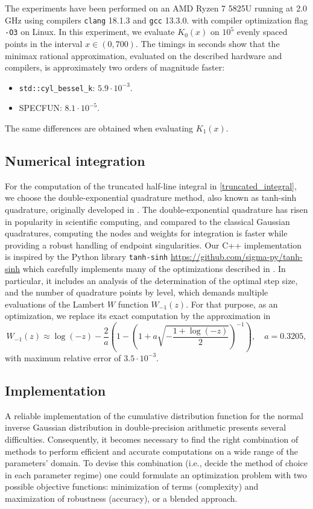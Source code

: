 \documentclass[10pt,a4paper,oneside]{article}
\numberwithin{equation}{section}
\begin{document}
The experiments have been performed on an AMD Ryzen 7 5825U running at 2.0 GHz using compilers \texttt{clang} 18.1.3 and \texttt{gcc} 13.3.0. with compiler optimization flag \texttt{-O3} on Linux. In this experiment, we evaluate $K_0(x)$ on $10^5$ evenly spaced points in the interval $x \in (0, 700)$. The timings in seconds show that the minimax rational approximation, evaluated on the described hardware and compilers, is approximately two orders of magnitude faster:
\begin{itemize}
\item \texttt{std::cyl\_bessel\_k}: $5.9 \cdot 10^{-3}$.
\item SPECFUN: $8.1 \cdot 10^{-5}$.
\end{itemize}
The same differences are obtained when evaluating $K_1(x)$.

\subsection{Numerical integration}\label{algorithmic_numerical_integration}
For the computation of the truncated half-line integral in \eqref{truncated_integral}, we choose the double-exponential quadrature method, also known as tanh-sinh quadrature, originally developed in \cite{Takahasi1973}. The double-exponential quadrature has risen in popularity in scientific computing, and compared to the classical Gaussian quadratures, computing the nodes and weights for integration is faster while providing a robust handling of endpoint singularities. Our C++ implementation is inspired by the Python library \texttt{tanh-sinh} \url{https://github.com/sigma-py/tanh-sinh} which carefully implements many of the optimizations described in \cite{Bailey2006TanhSinhHQ}. In particular, it includes an analysis of the determination of the optimal step size, and the number of quadrature points by level, which demands multiple evaluations of the Lambert $W$ function $W_{-1}(z)$. For that purpose, as an optimization, we replace its exact computation by the approximation in \cite{Barry2004}
\begin{equation}
W_{-1}(z) \approx \log(-z) - \frac{2}{a} \left(1 - \left(1 + a \sqrt{-\frac{1 + \log(-z)}{2}}\right)^{-1}\right), \quad	a = 0.3205,
\end{equation}
with maximum relative error of $3.5\cdot 10^{-3}$.

\subsection{Implementation}\label{subsection_implementation}
A reliable implementation of the cumulative distribution function for the normal inverse Gaussian distribution in double-precision arithmetic presents several difficulties. Consequently, it becomes necessary to find the right combination of methods to perform efficient and accurate computations on a wide range of the parameters' domain. To devise this combination (i.e., decide the method of choice in each parameter regime) one could formulate an optimization problem with two possible objective functions: minimization of terms (complexity) and maximization of robustness (accuracy), or a blended approach.
\end{document}
